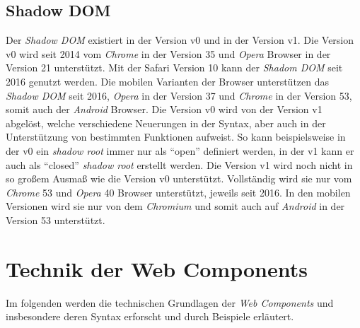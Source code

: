 \documentclass[12pt, paper=a4, bibtotoc, toc=listof, headsepline=true]{scrreprt}
\begin{document}
		\subsection{Shadow DOM}
		Der \emph{Shadow \ac{DOM}} existiert in der Version v0 und in der Version v1. Die Version v0 wird seit 2014 vom \emph{Chrome} in der Version 35 und \emph{Opera} Browser in der Version 21 unterstützt. Mit der Safari Version 10 kann der \emph{Shadom \ac{DOM}} seit 2016  genutzt werden.\cite[vgl.]{NiwaShaDom} Die mobilen Varianten der Browser unterstützen das \emph{Shadow \ac{DOM}} seit 2016, \emph{Opera} in der Version 37 und \emph{Chrome} in der Version 53, somit auch der \emph{Android} Browser.\cite[vgl.]{Hayato2016} Die Version v0 wird von der Version v1 abgelöst, welche verschiedene Neuerungen in der Syntax, aber auch in der Unterstützung von bestimmten Funktionen aufweist. So kann beispielsweise in der v0 ein \emph{shadow root} immer nur als \enquote{open} definiert werden, in der v1 kann er auch als \enquote{closed} \emph{shadow root} erstellt werden.\cite[vgl.]{Ito2016}
		Die Version v1 wird noch nicht in so großem Ausmaß wie die Version v0 unterstützt. Vollständig wird sie nur vom \emph{Chrome} 53 und \emph{Opera} 40 Browser unterstützt, jeweils seit 2016. In den mobilen Versionen wird sie nur von dem \emph{Chromium} und somit auch auf \emph{Android} in der Version 53 unterstützt.\cite[vlg.]{Hayato2016a}
	
			
	\section{Technik der Web Components}
	Im folgenden werden die technischen Grundlagen der \emph{Web Components} und insbesondere deren Syntax erforscht und durch Beispiele erläutert.
\end{document}
